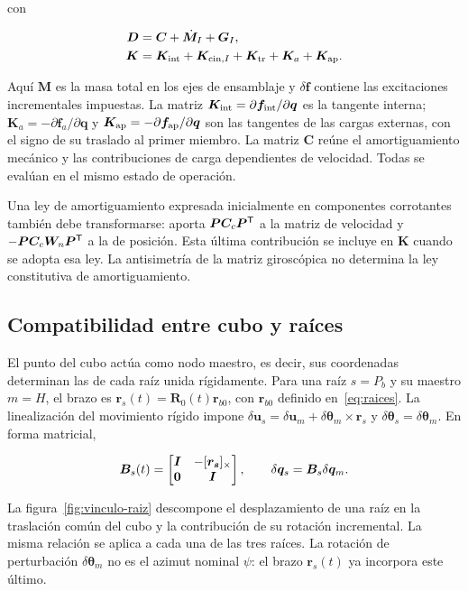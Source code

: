 con

\begin{align}
\bm D&=\bm C+\dot{\bm M}_I+\bm G_I,\nonumber\\
\bm K&=\bm K_{\rm int}+\bm K_{{\rm cin},I}
+\bm K_{\rm tr}+\bm K_a+\bm K_{\rm ap}.
\end{align}

Aquí $\bm M$ es la masa total en los ejes de ensamblaje y $\delta\bm f$ contiene las excitaciones incrementales impuestas. La matriz $\bm K_{\rm int}=\partial\bm f_{\rm int}/\partial\bm q$ es la tangente interna; $\bm K_a=-\partial\bm f_a/\partial\bm q$ y $\bm K_{\rm ap}=-\partial\bm f_{\rm ap}/\partial\bm q$ son las tangentes de las cargas externas, con el signo de su traslado al primer miembro. La matriz $\bm C$ reúne el amortiguamiento mecánico y las contribuciones de carga dependientes de velocidad. Todas se evalúan en el mismo estado de operación.

Una ley de amortiguamiento expresada inicialmente en componentes corrotantes también debe transformarse: aporta $\bm P\bm C_c\bm P^\mathsf T$ a la matriz de velocidad y $-\bm P\bm C_c\bm W_n\bm P^\mathsf T$ a la de posición. Esta última contribución se incluye en $\bm K$ cuando se adopta esa ley. La antisimetría de la matriz giroscópica no determina la ley constitutiva de amortiguamiento.

\subsection{Compatibilidad entre cubo y raíces}
El punto del cubo actúa como nodo maestro, es decir, sus coordenadas determinan las de cada raíz unida rígidamente. Para una raíz $s=P_b$ y su maestro $m=H$, el brazo es $\bm r_s(t)=\bm R_0(t)\bm r_{b0}$, con $\bm r_{b0}$ definido en~\eqref{eq:raices}. La linealización del movimiento rígido impone $\delta\bm u_s=\delta\bm u_m+\delta\bm\theta_m\times\bm r_s$ y $\delta\bm\theta_s=\delta\bm\theta_m$. En forma matricial,

\begin{equation}
\bm B_s(t)=\begin{bmatrix}\bm I&-[\bm{r_s}]_\times\\\bm0&\bm I\end{bmatrix},
\qquad \delta\bm q_s=\bm B_s\delta\bm q_m.
\label{eq:vinculo-raiz}
\end{equation}

La figura~\ref{fig:vinculo-raiz} descompone el desplazamiento de una raíz en la traslación común del cubo y la contribución de su rotación incremental. La misma relación se aplica a cada una de las tres raíces. La rotación de perturbación $\delta\bm\theta_m$ no es el azimut nominal $\psi$: el brazo $\bm r_s(t)$ ya incorpora este último.


